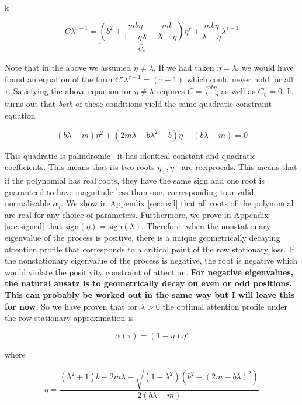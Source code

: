 k\documentclass{article}
\begin{document}
\begin{equation}
    C\lambda^{\tau-1} = \underbrace{\left(b^2 + \frac{mb\eta}{1-\eta\lambda} - \frac{mb}{\lambda-\eta}\right)}_{C_\eta}\eta^\tau + \frac{mb\eta}{\lambda-\eta}\lambda^{\tau-1}
\end{equation}

Note that in the above we assumed $\eta\neq \lambda$. If we had taken $\eta = \lambda$, we would have found an equation of the form $C'\lambda^{\tau-1} = (\tau-1)$ which could never hold for all $\tau$. Satisfying the above equation for $\eta \neq \lambda$ requires $C= \frac{mb\eta}{\lambda - \eta}$ as well as $C_\eta = 0$. It turns out that \textit{both} of these conditions yield the same quadratic constraint equation

\begin{equation}\label{quad}
    (b\lambda - m)\eta^2 + (2m\lambda - b\lambda^2 -b)\eta + (b\lambda-m) = 0
\end{equation}

This quadratic is palindromic-- it has identical constant and quadratic coefficients. This means that its two roots $\eta_{+}, \eta_{-}$ are reciprocals. This means that if the polynomial has real roots, they have the same sign and one root is guaranteed to have magnitude less than one, corresponding to a valid, normalizable $\alpha_\tau$. We show in Appendix \ref{sec:real} that all roots of the polynomial are real for any choice of parameters. Furthermore, we prove in Appendix \ref{sec:signed} that $\text{sign}(\eta) = \text{sign}(\lambda)$. Therefore, when the nonstationary eigenvalue of the process is positive, there is a unique geometrically decaying attention profile that corresponds to a critical point of the row stationary loss. If the nonstationary eigenvalue of the process is negative, the root is negative which would violate the positivity constraint of attention. \textbf{For negative eigenvalues, the natural ansatz is to geometrically decay on even or odd positions. This can probably be worked out in the same way but I will leave this for now.} So we have proven that for $\lambda > 0$ the optimal attention profile under the row stationary approximation is 

\begin{equation}
    \alpha(\tau) = (1-\eta)\eta^\tau
\end{equation}

where

\begin{equation}
    \eta = \frac{(\lambda^2 + 1)b - 2m\lambda - \sqrt{(1-\lambda^2)(b^2 - (2m - b\lambda)^2)}}{2(b\lambda - m)}
\end{equation}
\end{document}
